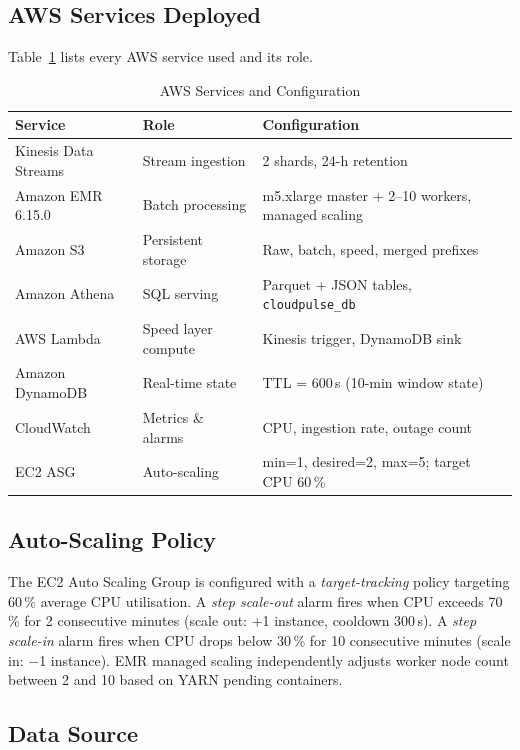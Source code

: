 \documentclass[conference]{IEEEtran}
\begin{document}
\subsection{AWS Services Deployed}

Table~\ref{tab:aws} lists every AWS service used and its role.

\begin{table}[ht]
\caption{AWS Services and Configuration}
\label{tab:aws}
\centering
\scriptsize
\begin{tabular}{p{1.8cm} p{2.4cm} p{3.2cm}}
\toprule
\textbf{Service} & \textbf{Role} & \textbf{Configuration} \\
\midrule
Kinesis Data Streams & Stream ingestion & 2 shards, 24-h retention \\
Amazon EMR 6.15.0 & Batch processing & m5.xlarge master + 2--10 workers, managed scaling \\
Amazon S3 & Persistent storage & Raw, batch, speed, merged prefixes \\
Amazon Athena & SQL serving & Parquet + JSON tables, \texttt{cloudpulse\_db} \\
AWS Lambda & Speed layer compute & Kinesis trigger, DynamoDB sink \\
Amazon DynamoDB & Real-time state & TTL = 600\,s (10-min window state) \\
CloudWatch & Metrics \& alarms & CPU, ingestion rate, outage count \\
EC2 ASG & Auto-scaling & min=1, desired=2, max=5; target CPU 60\,\% \\
\bottomrule
\end{tabular}
\end{table}

\subsection{Auto-Scaling Policy}

The EC2 Auto Scaling Group is configured with a \textit{target-tracking} policy
targeting 60\,\% average CPU utilisation. A \textit{step scale-out} alarm fires
when CPU exceeds 70\,\% for 2 consecutive minutes (scale out: +1 instance, cooldown
300\,s). A \textit{step scale-in} alarm fires when CPU drops below 30\,\% for
10 consecutive minutes (scale in: $-$1 instance). EMR managed scaling independently
adjusts worker node count between 2 and 10 based on YARN pending containers.

\subsection{Data Source}
\end{document}
